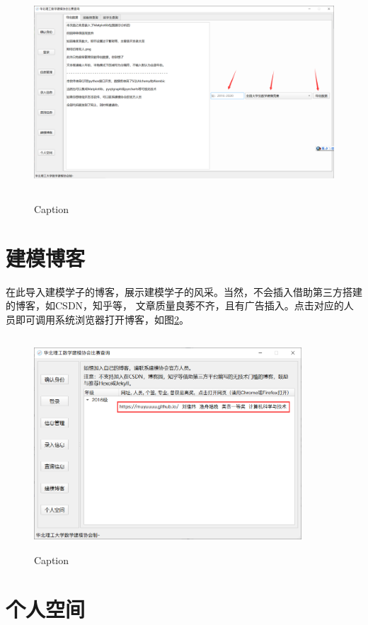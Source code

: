 \documentclass[cn,11pt,chinese, hazy]{elegantbook}
\begin{document}
\begin{figure}[h]
    \centering
    \includegraphics[width=12cm, height=8cm]{figure/9.png}
    \caption{Caption}
    \label{fig:export_data}
\end{figure}

\newpage

\section{建模博客}

在此导入建模学子的博客，展示建模学子的风采。当然，不会插入借助第三方搭建的博客，如CSDN，知乎等，
文章质量良莠不齐，且有广告插入。点击对应的人员即可调用系统浏览器打开博客，如图\ref{fig:blog}。

\begin{figure}[h]
    \centering
    \includegraphics[width=10cm, height=8cm]{figure/10.png}
    \caption{Caption}
    \label{fig:blog}
\end{figure}

\section{个人空间}
\end{document}
